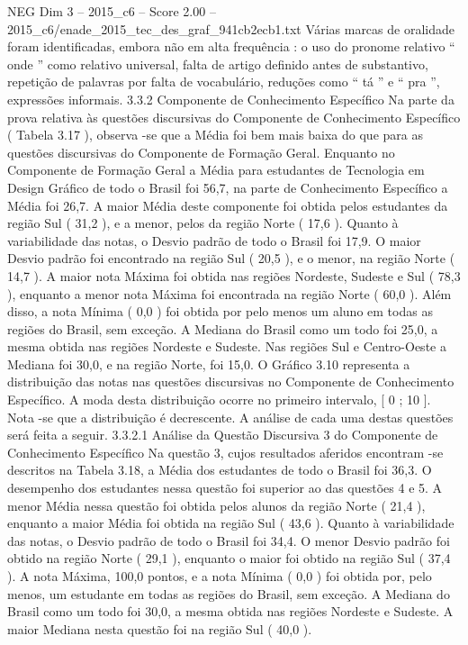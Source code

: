 \begin{textsample}{NEG Dim 3 – 2015\_c6 – Score 2.00 – 2015\_c6/enade\_2015\_tec\_des\_graf\_941cb2ecb1.txt}
Várias marcas de oralidade foram identificadas, embora não em alta frequência : o uso do pronome relativo “ onde ” como relativo universal, falta de artigo definido antes de substantivo, repetição de palavras por falta de vocabulário, reduções como “ tá ” e “ pra ”, expressões informais. 3.3.2 Componente de Conhecimento Específico Na parte da prova relativa às questões discursivas do Componente de Conhecimento Específico ( Tabela 3.17 ), observa -se que a Média foi bem mais baixa do que para as questões discursivas do Componente de Formação Geral.
Enquanto no Componente de Formação Geral a Média para estudantes de Tecnologia em Design Gráfico de todo o Brasil foi 56,7, na parte de Conhecimento Específico a Média foi 26,7.
A maior Média deste componente foi obtida pelos estudantes da região Sul ( 31,2 ), e a menor, pelos da região Norte ( 17,6 ).
Quanto à variabilidade das notas, o Desvio padrão de todo o Brasil foi 17,9.
O maior Desvio padrão foi encontrado na região Sul ( 20,5 ), e o menor, na região Norte ( 14,7 ).
A maior nota Máxima foi obtida nas regiões Nordeste, Sudeste e Sul ( 78,3 ), enquanto a menor nota Máxima foi encontrada na região Norte ( 60,0 ).
Além disso, a nota Mínima ( 0,0 ) foi obtida por pelo menos um aluno em todas as regiões do Brasil, sem exceção.
A Mediana do Brasil como um todo foi 25,0, a mesma obtida nas regiões Nordeste e Sudeste.
Nas regiões Sul e Centro-Oeste a Mediana foi 30,0, e na região Norte, foi 15,0.
O Gráfico 3.10 representa a distribuição das notas nas questões discursivas no Componente de Conhecimento Específico.
A moda desta distribuição ocorre no primeiro intervalo, [ 0 ; 10 ].
Nota -se que a distribuição é decrescente.
A análise de cada uma destas questões será feita a seguir. 3.3.2.1 Análise da Questão Discursiva 3 do Componente de Conhecimento Específico Na questão 3, cujos resultados aferidos encontram -se descritos na Tabela 3.18, a Média dos estudantes de todo o Brasil foi 36,3.
O desempenho dos estudantes nessa questão foi superior ao das questões 4 e 5.
A menor Média nessa questão foi obtida pelos alunos da região Norte ( 21,4 ), enquanto a maior Média foi obtida na região Sul ( 43,6 ).
Quanto à variabilidade das notas, o Desvio padrão de todo o Brasil foi 34,4.
O menor Desvio padrão foi obtido na região Norte ( 29,1 ), enquanto o maior foi obtido na região Sul ( 37,4 ).
A nota Máxima, 100,0 pontos, e a nota Mínima ( 0,0 ) foi obtida por, pelo menos, um estudante em todas as regiões do Brasil, sem exceção.
A Mediana do Brasil como um todo foi 30,0, a mesma obtida nas regiões Nordeste e Sudeste.
A maior Mediana nesta questão foi na região Sul ( 40,0 ).

\end{textsample}
